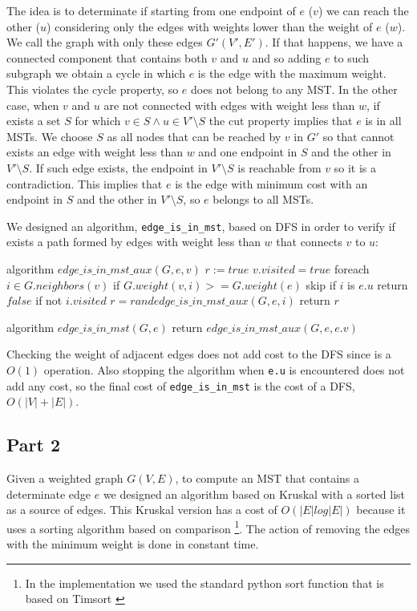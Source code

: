 \documentclass[paper=a4, fontsize=11pt]{scrartcl} %
\numberwithin{equation}{section} %
\numberwithin{figure}{section} %
\numberwithin{table}{section} %
\begin{document}
The idea is to determinate if starting from one endpoint of $e$ ($v$) we can reach the other ($u$) considering only the edges with weights lower than the weight of $e$ ($w$).
We call the graph with only these edges $G'(V', E')$.
If that happens, we have a connected component that contains both $v$ and $u$ and so adding $e$ to such subgraph we obtain a cycle in which $e$ is the edge with the maximum weight. This violates the cycle property, so $e$ does not belong to any MST.
In the other case, when $v$ and $u$ are not connected with edges with weight less than $w$, if exists a set $S$ for which $v \in S \land u \in V' \setminus S$ the cut property implies that $e$ is in all MSTs.
We choose $S$ as all nodes that can be reached by $v$ in $G'$ so that cannot exists an edge with weight less than $w$ and one endpoint in $S$ and the other in $V' \setminus S$. If such edge exists, the endpoint in $V' \setminus S$ is reachable from $v$ so it is a contradiction.
This implies that $e$ is the edge with minimum cost with an endpoint in $S$ and the other in $V' \setminus S$, so $e$ belongs to all MSTs.

We designed an algorithm, \verb|edge_is_in_mst|, based on DFS in order to verify if exists a path formed by edges with weight less than $w$ that connects $v$ to $u$:

\begin{pseudo}
algorithm $edge\_is\_in\_mst\_aux(G, e, v)$
    $r := true$
    $v.visited = true$
    foreach $i \in G.neighbors(v)$
        if $G.weight(v, i) >= G.weight(e)$
            skip
        if $i$ is $e.u$
            return $false$
        if not $i.visited$
            $r = r and edge\_is\_in\_mst\_aux(G, e, i)$
    return $r$
\end{pseudo}
\begin{pseudo}
algorithm $edge\_is\_in\_mst(G, e)$
    return $edge\_is\_in\_mst\_aux(G, e, e.v)$
\end{pseudo}

Checking the weight of adjacent edges does not add cost to the DFS since is a $O(1)$ operation. Also stopping the algorithm when \verb|e.u| is encountered does not add any cost, so the final cost of \verb|edge_is_in_mst| is the cost of a DFS, $O(|V|+|E|)$.

\subsection*{Part 2}

Given a weighted graph $G(V, E)$, to compute an MST that contains a determinate edge $e$ we designed an algorithm based on Kruskal with a sorted list as a source of edges.
This Kruskal version has a cost of $O(|E|log|E|)$ because it uses a sorting algorithm based on comparison \footnote{In the implementation we used the standard python sort function that is based on Timsort \cite{timsort}}. The action of removing the edges with the minimum weight is done in constant time.
\end{document}
